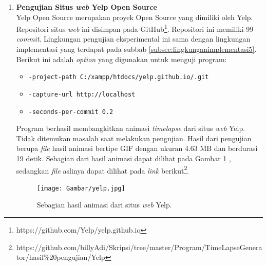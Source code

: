 \begin{enumerate}
\item \textbf{Pengujian Situs \textit{web} Yelp Open Source}\\
Yelp Open Source merupakan proyek Open Source yang dimiliki oleh Yelp. Repositori situs \textit{web} ini disimpan pada GitHub\footnote{https://github.com/Yelp/yelp.github.io}. Repositori ini memiliki 99 \textit{commit}. Lingkungan pengujian eksperimental ini sama dengan lingkungan implementasi yang terdapat pada subbab \ref{subsec:lingkunganimplementasi5}. Berikut ini adalah \textit{option} yang digunakan untuk menguji program:
\begin{itemize}
\item \texttt{-project-path C:/xampp/htdocs/yelp.github.io/.git}
\item \texttt{-capture-url http://localhost}
\item \texttt{-seconds-per-commit 0.2} 
\end{itemize}
Program berhasil membangkitkan animasi \textit{timelapse} dari situs \textit{web} Yelp. Tidak ditemukan masalah saat melakukan pengujian. Hasil dari pengujian berupa \textit{file} hasil animasi bertipe GIF dengan ukuran 4.63 MB dan berdurasi 19 detik. Sebagian dari hasil animasi dapat dilihat pada Gambar \ref{fig:hasil_yelp} , sedangkan \textit{file} aslinya dapat dilihat pada \textit{link} berikut\footnote{https://github.com/billyAdi/Skripsi/tree/master/Program/TimeLapseGenerator/hasil\%20pengujian/Yelp}.


\begin{figure}[H]	
		\texttt{[image: Gambar/yelp.jpg]}
	\caption{Sebagian hasil animasi dari situs \textit{web} Yelp.}
	\label{fig:hasil_yelp}
\end{figure}




\end{enumerate}




